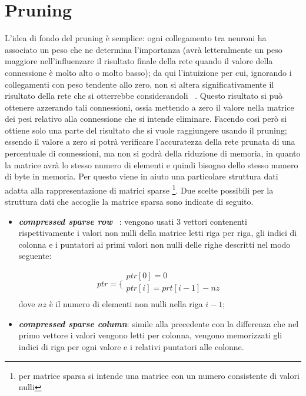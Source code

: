 \documentclass[12pt]{report}
\begin{document}
\section{Pruning}\label{pruning}

L’idea di fondo del pruning è semplice: ogni collegamento tra neuroni ha associato un peso che ne determina l’importanza (avrà letteralmente un peso maggiore nell’influenzare il risultato finale della rete quando il valore della connessione è molto alto o molto basso); da qui l’intuizione per cui, ignorando i collegamenti con peso tendente allo zero, non si altera significativamente il risultato della rete che si otterrebbe considerandoli ~\cite{Pruning}.
Questo risultato si può ottenere azzerando tali connessioni, ossia mettendo a zero il valore nella matrice dei pesi relativo alla connessione che si intende eliminare. Facendo così però si ottiene solo una parte del risultato che si vuole raggiungere usando il pruning; essendo il valore a zero si potrà verificare l'accuratezza della rete prunata di una percentuale di connessioni, ma non si godrà della riduzione di memoria, in quanto la matrice avrà lo stesso numero di elementi e quindi bisogno dello stesso numero di byte in memoria. Per questo viene in aiuto una particolare struttura dati adatta alla rappresentazione di matrici sparse \footnote{per matrice sparsa si intende una matrice con un numero consistente di valori nulli}. 
Due scelte possibili per la struttura dati che accoglie la matrice sparsa sono indicate di seguito.
\begin{itemize}
\item{\textbf{\textit{compressed sparse row}}} ~\cite{CSC}: vengono usati 3 vettori contenenti rispettivamente i valori non nulli della matrice letti riga per riga, gli indici di colonna e i puntatori ai primi valori non nulli delle righe descritti nel modo seguente: 

$$ptr =
\bigg \{
\begin{array}{ll}
ptr[0] = 0 \\
ptr[i] = prt[i - 1] - nz \\
\end{array}
$$
dove $nz$ è il numero di elementi non nulli nella riga $i - 1$;

\item{\textbf{\textit{compressed sparse column}}}: simile alla precedente con la differenza che nel primo vettore i valori vengono letti per colonna, vengono memorizzati gli indici di riga per ogni valore e i relativi puntatori alle colonne.
\end{itemize}
\end{document}
